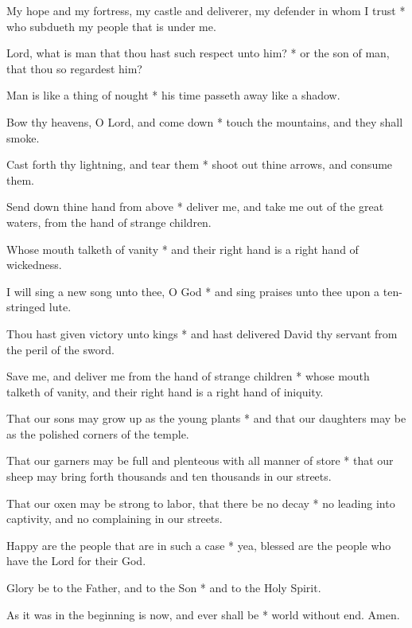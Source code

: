 \begin{multicols}{2}
	My hope and my fortress, my castle and deliverer, my defender in whom I trust * who subdueth my people that is under me.
	
	Lord, what is man that thou hast such respect unto him? * or the son of man, that thou so regardest him?
	
	Man is like a thing of nought * his time passeth away like a shadow.
	
	Bow thy heavens, O Lord, and come down * touch the mountains, and they shall smoke.
	
	Cast forth thy lightning, and tear them * shoot out thine arrows, and consume them.
	
	Send down thine hand from above * deliver me, and take me out of the great waters, from the hand of strange children.
	
	Whose mouth talketh of vanity * and their right hand is a right hand of wickedness.
	
	I will sing a new song unto thee, O God * and sing praises unto thee upon a ten-stringed lute.
	
	Thou hast given victory unto kings * and hast delivered David thy servant from the peril of the sword.
	
	Save me, and deliver me from the hand of strange children * whose mouth talketh of vanity, and their right hand is a right hand of iniquity.
	
	That our sons may grow up as the young plants * and that our daughters may be as the polished corners of the temple.
	
	That our garners may be full and plenteous with all manner of store * that our sheep may bring forth thousands and ten thousands in our streets.
	
	That our oxen may be strong to labor, that there be no decay * no leading into captivity, and no complaining in our streets.
	
	Happy are the people that are in such a case * yea, blessed are the people who have the Lord for their God.
	
	Glory be to the Father, and to the Son * and to the Holy Spirit.
	
	As it was in the beginning is now, and ever shall be * world without end. Amen.
\end{multicols}